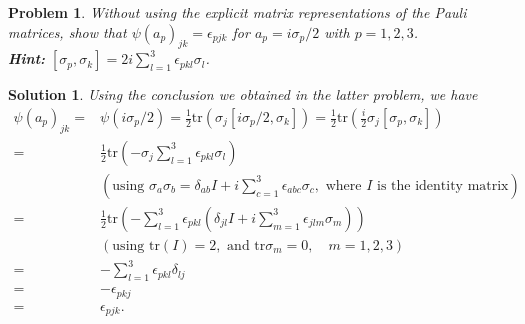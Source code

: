 \documentclass[UTF8,10pt,a4paper]{article}
\theoremstyle{Problem}
\newtheorem{prob}{Problem}
\theoremstyle{Solution}
\newtheorem*{sol}{Solution}
\begin{document}
\begin{prob}
    Without using the explicit matrix representations of the Pauli matrices, show that $\psi(a_p)_{jk}=\epsilon_{pjk}$ for $a_p=i\sigma_p/2$ with $p=1,2,3$.\\
    \textbf{Hint:} $[\sigma_p,\sigma_k]=2i\sum_{l=1}^3\epsilon_{pkl}\sigma_l$.
\end{prob}
\begin{sol}
    Using the conclusion we obtained in the latter problem, we have
    \begin{align}
        \nonumber\psi(a_p)_{jk}=&\psi(i\sigma_p/2)=\frac{1}{2}\text{tr}(\sigma_j[i\sigma_p/2,\sigma_k])=\frac{1}{2}\text{tr}\left(\frac{i}{2}\sigma_j[\sigma_p,\sigma_k]\right)\\
        \nonumber=&\frac{1}{2}\text{tr}\left(-\sigma_j\sum_{l=1}^3\epsilon_{pkl}\sigma_l\right)\\
        \nonumber&(\text{using }\sigma_a\sigma_b=\delta_{ab}I+i\sum_{c=1}^3\epsilon_{abc}\sigma_c,\text{ where }I\text{ is the identity matrix})\\
        \nonumber=&\frac{1}{2}\text{tr}\left(-\sum_{l=1}^3\epsilon_{pkl}\left(\delta_{jl}I+i\sum_{m=1}^3\epsilon_{jlm}\sigma_m\right)\right)\\
        \nonumber&(\text{using }\text{tr}(I)=2,\text{ and }\text{tr}\sigma_m=0,\quad m=1,2,3)\\
        \nonumber=&-\sum_{l=1}^3\epsilon_{pkl}\delta_{lj}\\
        \nonumber=&-\epsilon_{pkj}\\
        =&\epsilon_{pjk}.
    \end{align}
\end{sol}
\end{document}
